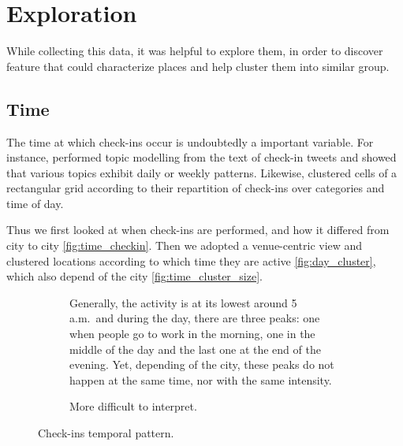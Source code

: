 \section{Exploration}

While collecting this data, it was helpful to explore them, in order to
discover feature that could characterize places and help cluster them into
similar group.

\subsection{Time}

The time at which check-ins occur is undoubtedly a important variable. For
instance, \textcite{UrbanStory12} performed topic modelling from the text of
check-in tweets and showed that various topics exhibit daily or weekly
patterns. Likewise, \textcite{TimeCluster13} clustered cells of a rectangular
grid according to their repartition of check-ins over categories and time of
day.

Thus we first looked at when check-ins are performed, and how it differed from
city to city \autoref{fig:time_checkin}. Then we adopted a venue-centric view
and clustered locations according to which time they are active
\autoref{fig:day_cluster}, which also depend of the city
\autoref{fig:time_cluster_size}.

\begin{figure}[hbt]
    \begin{subfigure}[b]{\textwidth}
    \centering
    \iftoggle{EXTERNALPGF}{%
        \texttt{[image: daily\_checkin]}
    }{%
        
    }
    \caption[Pattern of check-in during the day]{Generally, the activity is at
    its lowest around 5 a.m.\ and during the day, there are three peaks: one
when people go to work in the morning, one in the middle of the day and the
last one at the end of the evening. Yet, depending of the city, these peaks do
not happen at the same time, nor with the same intensity.
\label{fig:daily_checkin}}
    \end{subfigure}

    \begin{subfigure}[b]{\textwidth}
    \centering
    \iftoggle{EXTERNALPGF}{%
        \texttt{[image: weekly\_checkin]}
    }{%
        
    }
    \caption[Pattern of check-in during the week]{More difficult to interpret.
    \label{fig:weekly_checkin}}
    \end{subfigure}
    \caption{Check-ins temporal pattern.\label{fig:time_checkin}}
\end{figure}

